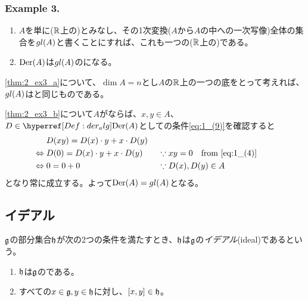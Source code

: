 \documentclass[../main]{subfiles}
\begin{document}
\subsubsection*{Example 3.}
\begin{theorem}\label{thm:gl}
  \begin{enumerate}[label=(\alph*)]
    \item \label{thm:2_ex3_a}$A$を単に($\mathbb{R}$上の)とみなし、その1次変換($A$から$A$の中への一次写像)全体の集合を$gl(A)$と書くことにすれば、これも一つの($\mathbb{R}$上の){}である。
    \item \label{thm:2_ex3_b}\href{Def:der_alg}{$\operatorname{Der}(A)$}は$gl(A)$の{}になる。
  \end{enumerate}
\end{theorem}

\begin{remark}
  \ref{thm:2_ex3_a}について、$\dim A=n$とし$A$の$\mathbb{R}$上の一つの底をとって考えれば、$gl(A)$はと同じものである。
\end{remark}

\begin{Proof}
  \ref{thm:2_ex3_b}について$A$がならば、$x,y\in A$、$D\in\href{Def:der_alg}{\Der(A)}$として{}の条件\eqref{eq:1_(9)}を確認すると
  \begin{align*}
    &D(xy) = D(x)\cdot y + x\cdot D(y)& \\
    \Leftrightarrow\;& D(0) = D(x)\cdot y + x\cdot D(y) &\;&\because xy=0\qq{from \eqref{eq:1_(4)}} \\
    \Leftrightarrow\;& 0 = 0+0 &\;&\because D(x),D(y)\in A
  \end{align*}
  となり常に成立する。よって$\operatorname{Der}(A)=gl(A)$となる。
\end{Proof}

\subsection{イデアル}

\begin{definition}[イデアル]\label{Def:2_2}
  $\mathfrak{g}$の部分集合$\mathfrak{h}$が次の2つの条件を満たすとき、$\mathfrak{h}$は$\mathfrak{g}$の\emph{イデアル}(ideal)であるという。
  \begin{enumerate}[label=(\roman*)$^\prime$]
    \item \label{Def:2_2_i'}$\mathfrak{h}$は$\mathfrak{g}$の{}である。
    \item \label{Def:2_2_ii'}すべての$x\in\mathfrak{g},y\in\mathfrak{h}$に対し、$\comm{x}{y}\in\h$。
  \end{enumerate}
\end{definition}
\end{document}
